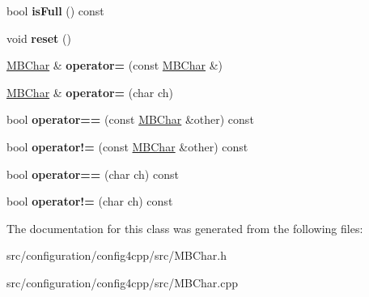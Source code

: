 \begin{DoxyCompactItemize}
\item 
\hypertarget{classCONFIG4CPP__NAMESPACE_1_1MBChar_a9baa83966e8acd7d1450524896a49482}{bool {\bfseries is\-Full} () const }\label{classCONFIG4CPP__NAMESPACE_1_1MBChar_a9baa83966e8acd7d1450524896a49482}

\item 
\hypertarget{classCONFIG4CPP__NAMESPACE_1_1MBChar_aa860c417472454ddee7188d1ccc0953a}{void {\bfseries reset} ()}\label{classCONFIG4CPP__NAMESPACE_1_1MBChar_aa860c417472454ddee7188d1ccc0953a}

\item 
\hypertarget{classCONFIG4CPP__NAMESPACE_1_1MBChar_a878a74cc2166862225f75b845f5b413f}{\hyperlink{classCONFIG4CPP__NAMESPACE_1_1MBChar}{M\-B\-Char} \& {\bfseries operator=} (const \hyperlink{classCONFIG4CPP__NAMESPACE_1_1MBChar}{M\-B\-Char} \&)}\label{classCONFIG4CPP__NAMESPACE_1_1MBChar_a878a74cc2166862225f75b845f5b413f}

\item 
\hypertarget{classCONFIG4CPP__NAMESPACE_1_1MBChar_ad766099ec2d566e8b7d954f661c88ac6}{\hyperlink{classCONFIG4CPP__NAMESPACE_1_1MBChar}{M\-B\-Char} \& {\bfseries operator=} (char ch)}\label{classCONFIG4CPP__NAMESPACE_1_1MBChar_ad766099ec2d566e8b7d954f661c88ac6}

\item 
\hypertarget{classCONFIG4CPP__NAMESPACE_1_1MBChar_abaa807b2ac2d3c831636e6ac42619518}{bool {\bfseries operator==} (const \hyperlink{classCONFIG4CPP__NAMESPACE_1_1MBChar}{M\-B\-Char} \&other) const }\label{classCONFIG4CPP__NAMESPACE_1_1MBChar_abaa807b2ac2d3c831636e6ac42619518}

\item 
\hypertarget{classCONFIG4CPP__NAMESPACE_1_1MBChar_a9a6674574e2e0b6db79bf47314e4d3e9}{bool {\bfseries operator!=} (const \hyperlink{classCONFIG4CPP__NAMESPACE_1_1MBChar}{M\-B\-Char} \&other) const }\label{classCONFIG4CPP__NAMESPACE_1_1MBChar_a9a6674574e2e0b6db79bf47314e4d3e9}

\item 
\hypertarget{classCONFIG4CPP__NAMESPACE_1_1MBChar_afa4f42bacc6b83819b3ee542c0378791}{bool {\bfseries operator==} (char ch) const }\label{classCONFIG4CPP__NAMESPACE_1_1MBChar_afa4f42bacc6b83819b3ee542c0378791}

\item 
\hypertarget{classCONFIG4CPP__NAMESPACE_1_1MBChar_a7168a9754d0bfb7dd5cdde9f90901d4e}{bool {\bfseries operator!=} (char ch) const }\label{classCONFIG4CPP__NAMESPACE_1_1MBChar_a7168a9754d0bfb7dd5cdde9f90901d4e}

\end{DoxyCompactItemize}


The documentation for this class was generated from the following files\-:\begin{DoxyCompactItemize}
\item 
src/configuration/config4cpp/src/M\-B\-Char.\-h\item 
src/configuration/config4cpp/src/M\-B\-Char.\-cpp\end{DoxyCompactItemize}
